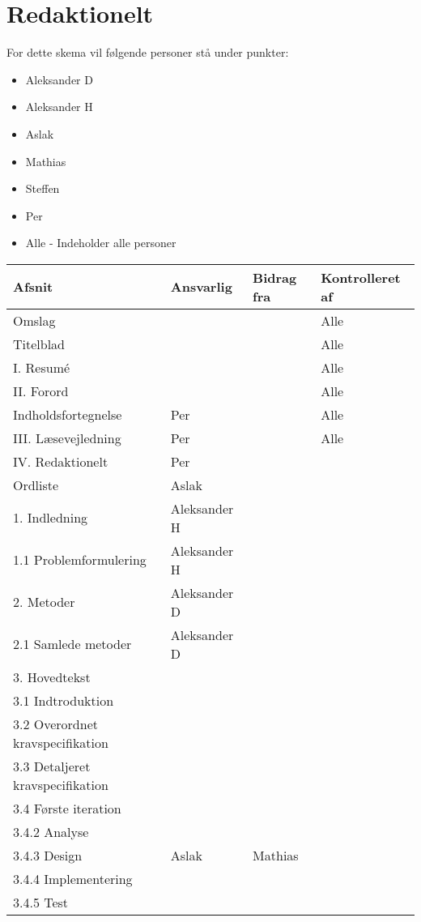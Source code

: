 \chapter{Redaktionelt}
For dette skema vil følgende personer stå under punkter: 
\begin{itemize}
\item Aleksander D
\item Aleksander H
\item Aslak
\item Mathias
\item Steffen
\item Per
\item Alle - Indeholder alle personer 
\end{itemize}

\begin{center}
\begin{longtable}{|m{5.8cm}|m{3.5cm}|m{3.5cm}|m{3.2cm}|}
\hline
\textbf{Afsnit} & \textbf{Ansvarlig} & \textbf{Bidrag fra} & \textbf{Kontrolleret af} \\
\hline
Omslag & & & Alle\\
\hline
Titelblad & & & Alle\\
\hline
I. Resumé & & & Alle\\ \hline
II. Forord & & & Alle\\ \hline
Indholdsfortegnelse & Per & & Alle\\ \hline
III. Læsevejledning & Per & & Alle\\ \hline

IV. Redaktionelt & Per & & \\ \hline
Ordliste & Aslak & & \\ \hline

1. Indledning & Aleksander H & & \\ \hline
1.1 Problemformulering & Aleksander H & & \\ \hline

2. Metoder & Aleksander D & & \\ \hline
2.1 Samlede metoder & Aleksander D & & \\ \hline

3. Hovedtekst & & & \\ \hline
3.1 Indtroduktion & & & \\ \hline
3.2 Overordnet kravspecifikation & & & \\ \hline
3.3 Detaljeret kravspecifikation & & & \\ \hline

3.4 Første iteration & & & \\ \hline
3.4.2 Analyse & & & \\ \hline
3.4.3 Design & Aslak & Mathias & \\ \hline
3.4.4 Implementering & & & \\ \hline
3.4.5 Test & & & \\ \hline


\end{longtable}
\end{center}
